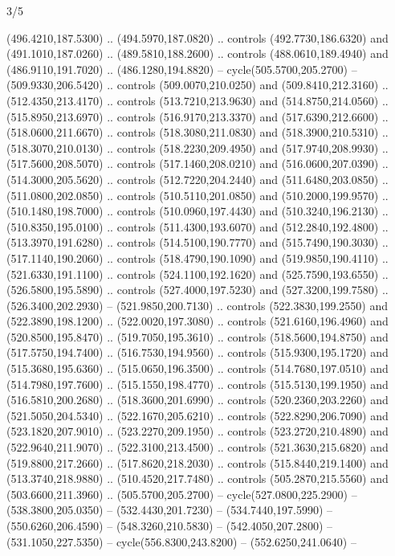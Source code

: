\begin{flagdescription}{3/5}
\begin{scope} [xshift=0.5\flagwidth*\stretchfactor,yshift=0.5\flagwidth,scale=\flagwidth/391]
\begin{scope}[y=0.8pt, x=0.8pt, yscale=-1, xscale=1,line width=0.01\lw,shift={(-98.875,-338.125)}]
\begin{scope}[cm={{0.15382,0.0,0.0,0.15382,(34.72393,273.11413)}}]
  (496.4210,187.5300) .. (494.5970,187.0820) .. controls (492.7730,186.6320) and
  (491.1010,187.0260) .. (489.5810,188.2600) .. controls (488.0610,189.4940) and
  (486.9110,191.7020) .. (486.1280,194.8820) -- cycle(505.5700,205.2700) --
  (509.9330,206.5420) .. controls (509.0070,210.0250) and (509.8410,212.3160) ..
  (512.4350,213.4170) .. controls (513.7210,213.9630) and (514.8750,214.0560) ..
  (515.8950,213.6970) .. controls (516.9170,213.3370) and (517.6390,212.6600) ..
  (518.0600,211.6670) .. controls (518.3080,211.0830) and (518.3900,210.5310) ..
  (518.3070,210.0130) .. controls (518.2230,209.4950) and (517.9740,208.9930) ..
  (517.5600,208.5070) .. controls (517.1460,208.0210) and (516.0600,207.0390) ..
  (514.3000,205.5620) .. controls (512.7220,204.2440) and (511.6480,203.0850) ..
  (511.0800,202.0850) .. controls (510.5110,201.0850) and (510.2000,199.9570) ..
  (510.1480,198.7000) .. controls (510.0960,197.4430) and (510.3240,196.2130) ..
  (510.8350,195.0100) .. controls (511.4300,193.6070) and (512.2840,192.4800) ..
  (513.3970,191.6280) .. controls (514.5100,190.7770) and (515.7490,190.3030) ..
  (517.1140,190.2060) .. controls (518.4790,190.1090) and (519.9850,190.4110) ..
  (521.6330,191.1100) .. controls (524.1100,192.1620) and (525.7590,193.6550) ..
  (526.5800,195.5890) .. controls (527.4000,197.5230) and (527.3200,199.7580) ..
  (526.3400,202.2930) -- (521.9850,200.7130) .. controls (522.3830,199.2550) and
  (522.3890,198.1200) .. (522.0020,197.3080) .. controls (521.6160,196.4960) and
  (520.8500,195.8470) .. (519.7050,195.3610) .. controls (518.5600,194.8750) and
  (517.5750,194.7400) .. (516.7530,194.9560) .. controls (515.9300,195.1720) and
  (515.3680,195.6360) .. (515.0650,196.3500) .. controls (514.7680,197.0510) and
  (514.7980,197.7600) .. (515.1550,198.4770) .. controls (515.5130,199.1950) and
  (516.5810,200.2680) .. (518.3600,201.6990) .. controls (520.2360,203.2260) and
  (521.5050,204.5340) .. (522.1670,205.6210) .. controls (522.8290,206.7090) and
  (523.1820,207.9010) .. (523.2270,209.1950) .. controls (523.2720,210.4890) and
  (522.9640,211.9070) .. (522.3100,213.4500) .. controls (521.3630,215.6820) and
  (519.8800,217.2660) .. (517.8620,218.2030) .. controls (515.8440,219.1400) and
  (513.3740,218.9880) .. (510.4520,217.7480) .. controls (505.2870,215.5560) and
  (503.6600,211.3960) .. (505.5700,205.2700) -- cycle(527.0800,225.2900) --
  (538.3800,205.0350) -- (532.4430,201.7230) -- (534.7440,197.5990) --
  (550.6260,206.4590) -- (548.3260,210.5830) -- (542.4050,207.2800) --
  (531.1050,227.5350) -- cycle(556.8300,243.8200) -- (552.6250,241.0640) --

\end{scope}
\end{scope}
\end{scope}
\end{flagdescription}
